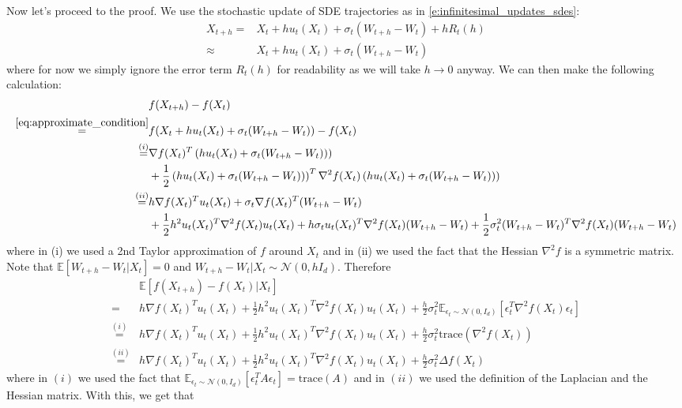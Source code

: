 Now let's proceed to the proof. We use the stochastic update of SDE trajectories as in \cref{e:infinitesimal_updates_sdes}:
\begin{align}
    X_{t+h} =& X_{t}+hu_t(X_t) + \sigma_t(W_{t+h}-W_{t})+hR_t(h)\\
    \label{eq:approximate_condition}
    \approx &X_{t}+hu_t(X_t) + \sigma_t(W_{t+h}-W_{t})
\end{align}
where for now we simply ignore the error term $R_t(h)$ for readability as we will take $h\to 0$ anyway. We can then make the following calculation:
\begin{align*}
    &f(X_{t+h})-f(X_t)\\
\overset{\eqref{eq:approximate_condition}}{=}&f(X_{t}+hu_t(X_t) + \sigma_t(W_{t+h}-W_{t}))-f(X_t)\\
\overset{(i)}{=}&\nabla f(X_t)^T\left(hu_t(X_t) + \sigma_t(W_{t+h}-W_{t}))\right)\\&+\frac{1}{2}\left(hu_t(X_t) + \sigma_t(W_{t+h}-W_{t}))\right)^T\nabla^2 f(X_t)\left(hu_t(X_t) + \sigma_t(W_{t+h}-W_{t}))\right)\\
\overset{(ii)}{=}&h\nabla f(X_t)^Tu_t(X_t) + \sigma_t\nabla f(X_t)^T(W_{t+h}-W_{t})\\&+\frac{1}{2}h^2u_t(X_t)^T\nabla^2 f(X_t)u_t(X_t)+ h\sigma_tu_t(X_t)^T\nabla^2 f(X_t)(W_{t+h}-W_{t})+\frac{1}{2}\sigma_t^2(W_{t+h}-W_t)^T\nabla^2 f(X_t)(W_{t+h}-W_t)
\end{align*}
where in (i) we used a 2nd Taylor approximation of $f$ around $X_t$ and in (ii) we used the fact that the Hessian $\nabla^2 f$ is a symmetric matrix. Note that $\mathbb{E}[W_{t+h}-W_t|X_t]=0$ and $W_{t+h}-W_{t}|X_t\sim\mathcal{N}(0,hI_d)$. Therefore
\begin{align*}
    &\mathbb{E}[f(X_{t+h})-f(X_t)|X_t]\\
=&h\nabla f(X_t)^Tu_t(X_t)+\frac{1}{2}h^2u_t(X_t)^T\nabla^2 f(X_t)u_t(X_t)+\frac{h}{2}\sigma_t^2\mathbb{E}_{\epsilon_t\sim\mathcal{N}(0,I_d)}[\epsilon_t^T\nabla^2 f(X_t)\epsilon_t]\\
\overset{(i)}{=}&h\nabla f(X_t)^Tu_t(X_t)+\frac{1}{2}h^2u_t(X_t)^T\nabla^2 f(X_t)u_t(X_t)+\frac{h}{2}\sigma_t^2\text{trace}(\nabla^2 f(X_t))\\
\overset{(ii)}{=}&h\nabla f(X_t)^Tu_t(X_t)+\frac{1}{2}h^2u_t(X_t)^T\nabla^2 f(X_t)u_t(X_t)+\frac{h}{2}\sigma_t^2\Delta f(X_t)
\end{align*}
where in $(i)$ we used the fact that $\mathbb{E}_{\epsilon_t\sim\mathcal{N}(0,I_d)}[\epsilon_t^T A\epsilon_t]=\text{trace}(A)$ and in $(ii)$ we used the definition of the Laplacian and the Hessian matrix. With this, we get that 
